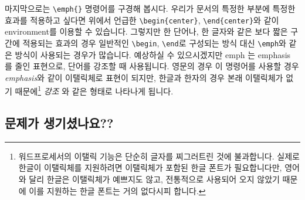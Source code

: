 마지막으로는 \verb|\emph{}| 명령어를 구경해 봅시다.
우리가 문서의 특정한 부분에 특정한 효과를 적용하고 싶다면 위에서 언급한 \verb|\begin{center}|, \verb|\end{center}|와 같이 environment를 이용할 수 있습니다.
그렇지만 한 단어나, 한 글자와 같은 보다 짧은 구간에 적용되는 효과의 경우 일반적인 \verb|\begin|, \verb|\end|로 구성되는 방식 대신 \verb|\emph|와 같은 방식이 사용되는 경우가 많습니다.
예상하실 수 있으시겠지만 emph 는 emphasis 를 줄인 표현으로, 단어를 강조할 때 사용됩니다. 영문의 경우 이 명령어를 사용할 경우 \emph{emphasis}와 같이 이탤릭체로 표현이 되지만, 한글과 한자의 경우 본래 이탤릭체가 없기 때문에\footnote{워드프로세서의 이탤릭 기능은 단순히 글자를 찌그러트린 것에 불과합니다. 실제로 한글이 이탤릭체를 지원하려면 이탤릭체가 포함된 한글 폰트가 필요합니다만, 영어와 달리 한글은 이탤릭체가 예쁘지도 않고, 전통적으로 사용되어 오지 않았기 때문에 이를 지원하는 한글 폰트는 거의 없다시피 합니다.} \emph{강조} 와 같은 형태로 나타나게 됩니다.

\subsection{문제가 생기셨나요??}
\label{sec:text-help}
